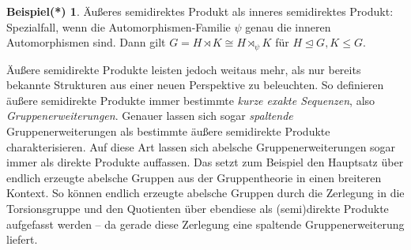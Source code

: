 \documentclass[a4paper, ngerman]{article}
\newcounter{chapter}
\numberwithin{equation}{chapter}
\theoremstyle{plain}
\theoremstyle{definition}
\newtheorem{examplestrd}{Beispiel(*)}[chapter]
\begin{document}
\begin{examplestrd}
    Äußeres semidirektes Produkt als inneres semidirektes Produkt: Spezialfall, wenn die Automorphismen-Familie \(\psi\) genau die inneren Automorphismen sind. Dann gilt \(G = H \rtimes K \cong H \rtimes_\psi K\) für \(H \trianglelefteq G, K \leq G\). 
\end{examplestrd}

Äußere semidirekte Produkte leisten jedoch weitaus mehr, als nur bereits bekannte Strukturen aus einer neuen Perspektive zu beleuchten. So definieren äußere semidirekte Produkte immer bestimmte \textit{kurze exakte Sequenzen}, also \textit{Gruppenerweiterungen}. Genauer lassen sich sogar \textit{spaltende} Gruppenerweiterungen als bestimmte äußere semidirekte Produkte charakterisieren. Auf diese Art lassen sich abelsche Gruppenerweiterungen sogar immer als direkte Produkte auffassen. Das setzt zum Beispiel den Hauptsatz über endlich erzeugte abelsche Gruppen aus der Gruppentheorie in einen breiteren Kontext. So können endlich erzeugte abelsche Gruppen durch die Zerlegung in die Torsionsgruppe und den Quotienten über ebendiese als (semi)direkte Produkte aufgefasst werden -- da gerade diese Zerlegung eine spaltende Gruppenerweiterung liefert. 

\printbibliography
\end{document}
